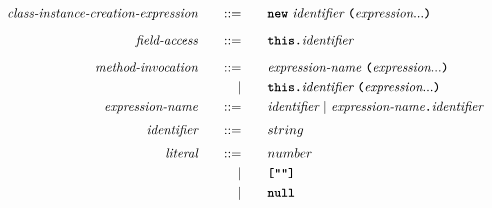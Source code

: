 \begin{alignat*}{9}
&& \textit{class-instance-creation-expression}   && \quad ::= & \quad && \textbf{\texttt{new}} \ \textit{identifier} \ \textbf{\texttt{(}} \textit{expression} ... \textbf{\texttt{)}} && \\[2mm]
&& \textit{field-access}                         && \quad ::= & \quad && \textbf{\texttt{this}} \textbf{\texttt{.}} \textit{identifier} && \\[2mm]
&& \textit{method-invocation}                    && \quad ::= & \quad && \textit{expression-name} \ \textbf{\texttt{(}} \textit{expression} ... \textbf{\texttt{)}} && \\
&&                                               &&         | & \quad && \textbf{\texttt{this}} \textbf{\texttt{.}} \textit{identifier} \ \textbf{\texttt{(}} \textit{expression} ... \textbf{\texttt{)}} && \\
&& \textit{expression-name}                      && \quad ::= & \quad && \textit{identifier} \ | \ \textit{expression-name} \textbf{\texttt{.}} \textit{identifier} && \\[1mm]
&& \textit{identifier}                           && \quad ::= & \quad && string && \\[1mm]
&& \textit{literal}                              && \quad ::= & \quad && number && \\
&&                                               &&         | & \quad && \textbf{\texttt{[""]}} && \\
&&                                               &&         | & \quad && \textbf{\texttt{null}} && \\[2mm]
\end{alignat*}
